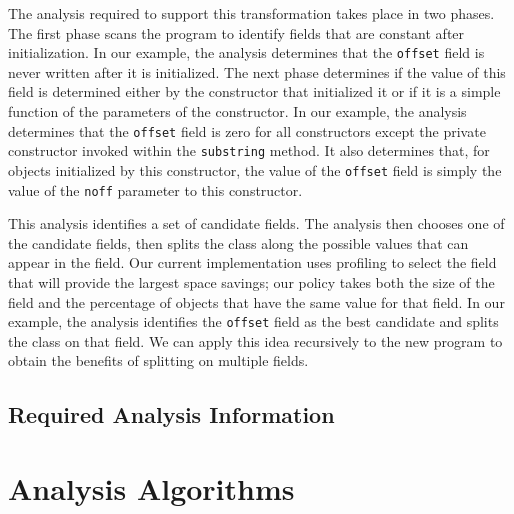 \documentclass[preprint]{acmconf}
\begin{document}
The analysis required to support this transformation takes place
in two phases. The first phase scans the program
to identify fields that
are constant after initialization. In our example, the analysis
determines that the {\tt offset} field is never written after
it is initialized. The next phase determines if the value
of this field is determined either by the constructor that
initialized it or if it is a simple function of the parameters
of the constructor. In our example, the analysis determines
that the {\tt offset} field is zero for all constructors
except the private constructor invoked within the {\tt substring}
method. It also determines that, for objects initialized by 
this constructor, the value of the {\tt offset} field is simply
the value of the {\tt noff} parameter to this constructor. 

This analysis identifies a set of candidate fields. 
The analysis then chooses one of the candidate fields, then 
splits the class along the possible values
that can appear in the field. Our current implementation uses
profiling to select the field that will provide the largest
space savings; our policy takes both the size of the field
and the percentage of objects that have the same value for 
that field. In our example, the analysis identifies the 
{\tt offset} field as the best candidate and splits the class
on that field. We can apply this idea recursively to the 
new program to obtain the benefits of splitting on multiple
fields. 

\subsection{Required Analysis Information}

\section{Analysis Algorithms}

\end{document}
